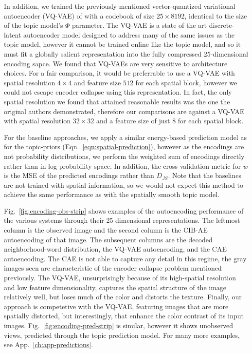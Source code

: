 In addition, we trained the previously mentioned vector-quantized variational autoencoder (VQ-VAE) of \citep{vqvae2017} with a codebook of size $25 \times 8192$, identical to the size of the topic model's $\Phi$ parameter. The VQ-VAE is a state of the art discrete-latent autoencoder model designed to address many of the same issues as the topic model, however it cannot be trained online like the topic model, and so it must fit a globally salient representation into the fully compressed $25$-dimensional encoding sapce. We found that VQ-VAEs are very sensitive to architecture choices. For a fair comparison, it would be preferrable to use a VQ-VAE with spatial resolution $4 \times 4$ and feature size $512$ for each spatial block, however we could not escape encoder collapse using this representation. In fact, the only spatial resolution we found that attained reasonable results was the one the original authors demonstrated, therefore our comparisons are against a VQ-VAE with spatial resolution $32 \times 32$ and a feature size of just $8$ for each spatial block.

For the baseline approaches, we apply a similar energy-based prediction model as for the topic-priors (Eqn.~\ref{eqn:spatial-prediction}), however as the encodings are not probability distributions, we perform the weighted sum of encodings directly rather than in log-probability space. In addition, the cross-validation metric for $w$ is the MSE of the predicted encodings rather than $D_{JS}$. Note that the baselines are not trained with spatial information, so we would not expect this method to achieve the same performance as with the spatially smooth topic model.

Fig.~\ref{fig:encoding-obs-strip} shows examples of the autoencoding performance of the various systems through their 25 dimensional representations. The leftmost column is the observed image and the second column is the CIB-AE autoencoding of that image. The subsequent columns are the decoded neighborhood-word distribution, the VQ-VAE autoencoding, and the CAE autoencoding. The CAE is not able to capture any detail in this regime, the gray images seen are characteristic of the encoder collapse problem mentioned previously. The VQ-VAE, unsurprisingly because of its high-spatial resolution and low feature dimensionality, captures the spatial structure of the image relatively well, but loses much of the color and distorts the texture. Finally, our approach is competetive with the VQ-VAE, featuring images that are more spatially distorted, but interestingly, that enhance the color contrast of its input images. Fig.~\ref{fig:encoding-pred-strip} is similar, however it shows unobserved views, predicted through the topic prediction model. For many more examples, see App.~\ref{ch:app-predictions}.

